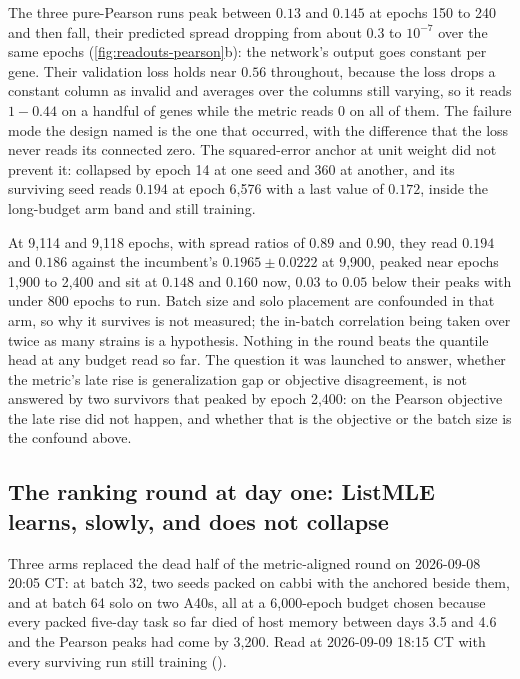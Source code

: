  The
three pure-Pearson runs peak between $0.13$ and $0.145$ at epochs 150 to 240 and then fall,
their predicted spread dropping from about $0.3$ to $10^{-7}$ over the same epochs
(\cref{fig:readouts-pearson}b): the network's output goes constant per gene. Their
validation loss holds near $0.56$ throughout, because the loss drops a constant column as
invalid and averages over the columns still varying, so it reads $1 - 0.44$ on a handful of
genes while the metric reads $0$ on all of them. The failure mode the design named is the
one that occurred, with the difference that the loss never reads its connected zero. The
squared-error anchor at unit weight did not prevent it:  collapsed by
epoch 14 at one seed and 360 at another, and its surviving seed reads 
$0.194$ at epoch 6{,}576 with a last value of $0.172$, inside the long-budget arm band and
still training.

 At 9{,}114 and
9{,}118 epochs, with spread ratios of $0.89$ and $0.90$, they read  $0.194$
and $0.186$ against the incumbent's $0.1965 \pm 0.0222$ at 9{,}900, peaked near epochs
1{,}900 to 2{,}400 and sit at $0.148$ and $0.160$ now, $0.03$ to $0.05$ below their
peaks with under 800 epochs to run. Batch size and solo placement are confounded in that
arm, so why it survives is not measured; the in-batch correlation being taken over twice
as many strains is a hypothesis. Nothing in the round beats the quantile head at any
budget read so far. The question it was launched to answer, whether the metric's late
rise is generalization gap or objective disagreement, is not answered by two survivors
that peaked by epoch 2{,}400: on the Pearson objective the late rise did not happen, and
whether that is the objective or the batch size is the confound above.

\subsection{The ranking round at day one: ListMLE learns, slowly, and does not collapse
}
\label{sec:readouts-listmle}

Three arms replaced the dead half of the metric-aligned round on 2026-09-08 20:05 CT:
 at batch 32, two seeds packed on cabbi with the anchored 
beside them, and  at batch 64 solo on two A40s, all at a 6{,}000-epoch
budget chosen because every packed five-day task so far died of host memory between days
3.5 and 4.6 and the Pearson peaks had come by 3{,}200. Read at 2026-09-09 18:15 CT with
every surviving run still training ().

